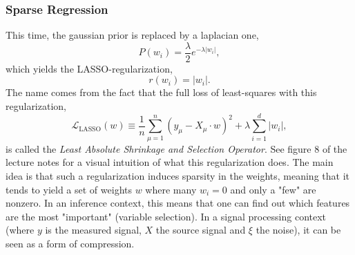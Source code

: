 \documentclass{article}
\begin{document}
\subsubsection*{Sparse Regression}
This time, the gaussian prior is replaced by a laplacian one,
\begin{equation}
    P(w_i)
    =
    \frac{\lambda}{2}e^{-\lambda |w_i|},
\end{equation}
which yields the LASSO-regularization,
\begin{equation}
    r(w_i) = |w_i|.
\end{equation}
The name comes from the fact that the full loss of least-squares with this regularization,
\begin{equation}
    \mathcal{L}_{\text{LASSO}}(w)
    \equiv
    \frac{1}{n}\sum_{\mu = 1}^{n} (y_{\mu} - X_{\mu} \cdot w)^2
    +
    \lambda \sum_{i=1}^{d} |w_i|,
\end{equation}
is called the \emph{Least Absolute Shrinkage and Selection Operator}. See figure 8 of the lecture notes for a visual intuition of what this regularization does. The main idea is that such a regularization induces sparsity in the weights, meaning that it tends to yield a set of weights $w$ where many $w_i=0$ and only a "few" are nonzero. In an inference context, this means that one can find out which features are the most "important" (variable selection). In a signal processing context (where $y$ is the measured signal, $X$ the source signal and $\xi$ the noise), it can be seen as a form of compression.
\end{document}

